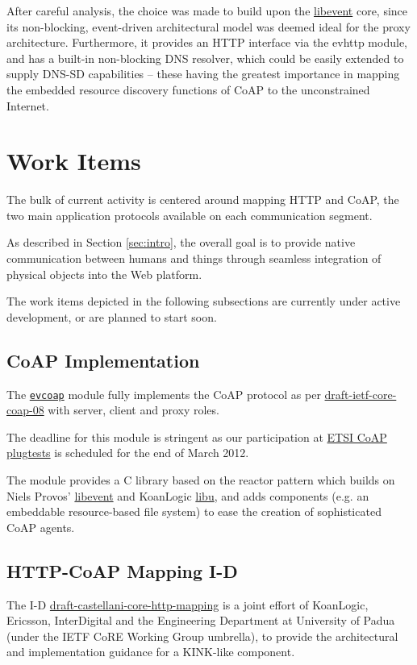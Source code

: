 \documentclass[12pt]{article}
\newcommand{\swmod}[1]{\mbox{\texttt{#1}}}
\begin{document}
After careful analysis, the choice was made to build upon the \href{http://libevent.org}{libevent} core, since its non-blocking, event-driven architectural model was deemed ideal for the proxy architecture.  Furthermore, it provides an HTTP interface via the evhttp module, and has a built-in non-blocking DNS resolver, which could be easily extended to supply DNS-SD capabilities -- these having the greatest importance in mapping the embedded resource discovery functions of CoAP to the unconstrained \mbox{Internet}.



\section{Work Items}
The bulk of current activity is centered around mapping HTTP and CoAP, the two main application protocols available on each communication segment.

As described in Section \ref{sec:intro}, the overall goal is to provide native communication between humans and things through seamless integration of physical objects into the Web platform.

The work items depicted in the following subsections are currently under active development, or are planned to start soon.

\subsection{CoAP Implementation}
The \href{https://github.com/koanlogic/webthings/tree/master/bits/evcoap}{\swmod{evcoap}} module fully implements the CoAP protocol as per \href{http://tools.ietf.org/html/draft-ietf-core-coap}{draft-ietf-core-coap-08} with server, client and proxy roles.

The deadline for this module is stringent as our participation at \href{http://www.etsi.org/plugtests/coap/coap.htm}{ETSI CoAP plugtests} is scheduled for the end of March 2012.

The module provides a C library based on the reactor pattern which builds on Niels Provos' \href{http://libevent.org}{libevent} and KoanLogic \href{http://koanlogic.com/libu}{libu}, and adds components (e.g. an embeddable resource-based file system) to ease the creation of sophisticated CoAP agents.

\subsection{HTTP-CoAP Mapping I-D}
The I-D \href{http://tools.ietf.org/html/draft-castellani-core-http-mapping}{draft-castellani-core-http-mapping} is a joint effort of \mbox{KoanLogic}, \mbox{Ericsson}, \mbox{InterDigital} and the Engineering Department at University of Padua (under the IETF CoRE Working Group umbrella), to provide the architectural and implementation guidance for a KINK-like component.
\end{document}
